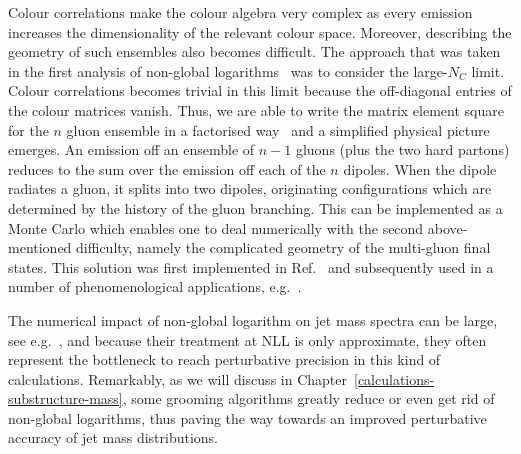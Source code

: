 Colour correlations make the colour algebra very complex as every
emission increases the dimensionality of the relevant colour
space. Moreover, describing the geometry of such ensembles also
becomes difficult. The approach that was taken in the first analysis
of non-global logarithms~\cite{Dasgupta:2001sh} was to consider the
large-$N_C$ limit. Colour correlations becomes trivial in this limit
because the off-diagonal entries of the colour matrices vanish. Thus,
we are able to write the matrix element square for the $n$ gluon
ensemble in a factorised way~\cite{Bassetto:1984ik} and a simplified
physical picture emerges. An emission off an ensemble of $n-1$ gluons
(plus the two hard partons) reduces to the sum over the emission off
each of the $n$ dipoles.
%
When the dipole radiates a gluon, it splits into two dipoles, originating configurations which are determined by the history of the gluon branching.
%
This can be implemented as a Monte Carlo which enables one to deal
numerically with the second above-mentioned difficulty, namely the
complicated geometry of the multi-gluon final states. This solution
was first implemented in Ref.~\cite{Dasgupta:2001sh} and subsequently
used in a number of phenomenological applications,
e.g.~\cite{Dasgupta:2002dc,Banfi:2006gy,Banfi:2008qs,Banfi:2010pa,Dasgupta:2012hg}.

The numerical impact of non-global logarithm on jet mass spectra can
be large, see e.g.~\cite{Banfi:2010pa,Dasgupta:2012hg}, and because
their treatment at NLL is only approximate, they often represent the
bottleneck to reach perturbative precision in this kind of
calculations. Remarkably, as we will discuss in
Chapter~\ref{calculations-substructure-mass}, some grooming algorithms
greatly reduce or even get rid of non-global logarithms, thus paving
the way towards an improved perturbative accuracy of jet mass distributions. 


